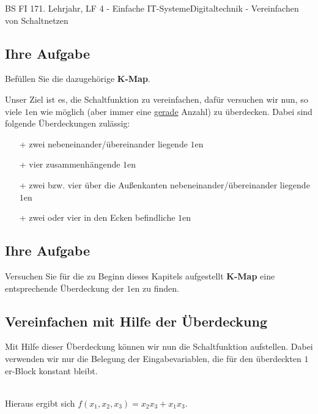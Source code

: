 \documentclass[11pt,twocolumn,oneside,openany,headings=optiontotoc,11pt,numbers=noenddot]{article}
\begin{document}
\begin{worksheet}{BS FI 17}{1. Lehrjahr, LF 4 - Einfache IT-Systeme}{Digitaltechnik - Vereinfachen von Schaltnetzen}
		\subsection*{Ihre Aufgabe} Befüllen Sie die dazugehörige \textbf{K-Map}.
		\begin{karnaugh-map}[4][4][1][$x_3x_4$][$x_1x_2$]
			
		\end{karnaugh-map}
		Unser Ziel ist es, die Schaltfunktion zu vereinfachen, dafür versuchen wir nun, so viele \(1\)en wie möglich (aber immer eine \underline{gerade} Anzahl) zu überdecken. Dabei sind folgende Überdeckungen zulässig:
		\begin{itemize}
			\item[+] zwei nebeneinander/übereinander liegende \(1\)en
			\item[+] vier zusammenhängende \(1\)en
			\item[+] zwei bzw. vier über die Außenkanten nebeneinander/übereinander liegende \(1\)en
			\item[+] zwei oder vier in den Ecken befindliche \(1\)en
		\end{itemize}
		\begin{karnaugh-map}[4][4][1][$x_3x_4$][$x_1x_2$]
		\end{karnaugh-map}
		\begin{karnaugh-map}[4][4][1][$x_3x_4$][$x_1x_2$]
		\end{karnaugh-map}
		\begin{karnaugh-map}[4][4][1][$x_3x_4$][$x_1x_2$]
		\end{karnaugh-map}
		\begin{karnaugh-map}[4][4][1][$x_3x_4$][$x_1x_2$]
			\implicantcorner
		\end{karnaugh-map}
		\subsection*{Ihre Aufgabe} Versuchen Sie für die zu Beginn dieses Kapitels aufgestellt \textbf{K-Map} eine entsprechende Überdeckung der \(1\)en zu finden.\\
		\subsection{Vereinfachen mit Hilfe der Überdeckung}
		Mit Hilfe dieser Überdeckung können wir nun die Schaltfunktion aufstellen. Dabei verwenden wir nur die Belegung der Eingabevariablen, die für den überdeckten \(1\)er-Block konstant bleibt.
		\begin{karnaugh-map}[4][2][1][$x_2x_3$][$x_1$]
		\end{karnaugh-map}\\
		Hieraus ergibt sich \(f(x_1,x_2,x_3) = x_2x_3 + x_1x_3\).\\

\end{worksheet}
\end{document}
